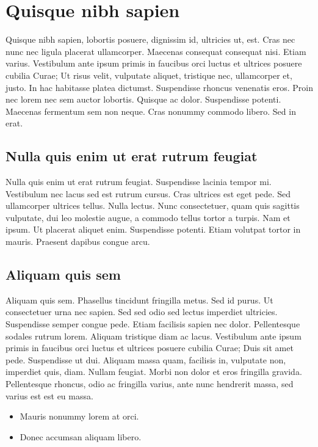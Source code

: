 \documentclass[eng,printmode]{mgr}
\begin{document}
\chapter{Quisque nibh sapien}
Quisque nibh sapien, lobortis posuere, dignissim id, ultricies ut, est. Cras nec nunc nec ligula placerat ullamcorper. Maecenas consequat consequat nisi. Etiam varius. Vestibulum ante ipsum primis in faucibus orci luctus et ultrices posuere cubilia Curae; Ut risus velit, vulputate aliquet, tristique nec, ullamcorper et, justo. In hac habitasse platea dictumst. Suspendisse rhoncus venenatis eros. Proin nec lorem nec sem auctor lobortis. Quisque ac dolor. Suspendisse potenti. Maecenas fermentum sem non neque. Cras nonummy commodo libero. Sed in erat. 

\section{Nulla quis enim ut erat rutrum feugiat}
Nulla quis enim ut erat rutrum feugiat. Suspendisse lacinia tempor mi. Vestibulum nec lacus sed est rutrum cursus. Cras ultrices est eget pede. Sed ullamcorper ultrices tellus. Nulla lectus. Nunc consectetuer, quam quis sagittis vulputate, dui leo molestie augue, a commodo tellus tortor a turpis. Nam et ipsum. Ut placerat aliquet enim. Suspendisse potenti. Etiam volutpat tortor in mauris. Praesent dapibus congue arcu. 

\section{Aliquam quis sem}
Aliquam quis sem. Phasellus tincidunt fringilla metus. Sed id purus. Ut consectetuer urna nec sapien. Sed sed odio sed lectus imperdiet ultricies. Suspendisse semper congue pede. Etiam facilisis sapien nec dolor. Pellentesque sodales rutrum lorem. Aliquam tristique diam ac lacus. Vestibulum ante ipsum primis in faucibus orci luctus et ultrices posuere cubilia Curae; Duis sit amet pede. Suspendisse ut dui. Aliquam massa quam, facilisis in, vulputate non, imperdiet quis, diam. Nullam feugiat. Morbi non dolor et eros fringilla gravida. Pellentesque rhoncus, odio ac fringilla varius, ante nunc hendrerit massa, sed varius est est eu massa. 

\begin{itemize}
\item Mauris nonummy lorem at orci.
\item Donec accumsan aliquam libero.
\end{itemize}
\end{document}
